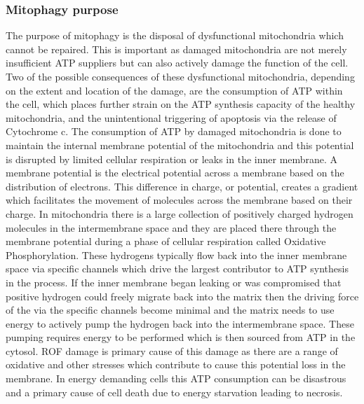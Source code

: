 \subsubsection{Mitophagy purpose}
The purpose of mitophagy is the disposal of dysfunctional mitochondria which cannot be repaired. This is important as damaged mitochondria are not merely insufficient ATP suppliers but can also actively damage the function of the cell. Two of the possible consequences of these dysfunctional mitochondria, depending on the extent and location of the damage, are the consumption of ATP within the cell, which places further strain on the ATP synthesis capacity of the healthy mitochondria, and the unintentional triggering of apoptosis via the release of Cytochrome c. The consumption of ATP by damaged mitochondria is done to maintain the internal membrane potential of the mitochondria and this potential is disrupted by limited cellular respiration or leaks in the inner membrane.\cite{ATPconsum-2010} A membrane potential is the electrical potential across a membrane based on the distribution of electrons. This difference in charge, or potential, creates a gradient which facilitates the movement of molecules across the membrane based on their charge. In mitochondria there is a large collection of positively charged hydrogen molecules in the intermembrane space and they are placed there through the membrane potential during a phase of cellular respiration called Oxidative Phosphorylation. These hydrogens typically flow back into the inner membrane space via specific channels which drive the largest contributor to ATP synthesis in the process.\cite{introPhys-2013} If the inner membrane began leaking or was compromised that positive hydrogen could freely migrate back into the matrix then the driving force of the via the specific channels become minimal and the matrix needs to use energy to actively pump the hydrogen back into the intermembrane space. These pumping requires energy to be performed which is then sourced from ATP in the cytosol. ROF damage is primary cause of this damage as there are a range of oxidative and other stresses which contribute to cause this potential loss in the membrane.\cite{ATPconsum-2010} In energy demanding cells this ATP consumption can be disastrous and a primary cause of cell death due to energy starvation leading to necrosis.
